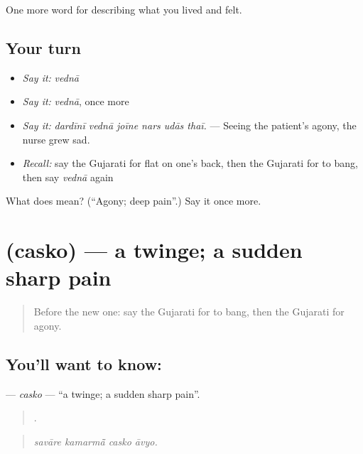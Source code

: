 \begin{grammarlens}[title={What you've built}]
One more word for describing what you lived and felt.
\end{grammarlens}

\subsection*{Your turn}
\begin{itemize}
\raggedright
  \item \emph{Say it:} \emph{vednā}
  \item \emph{Say it:} \emph{vednā}, once more
  \item \emph{Say it:} \emph{dardīnī vednā joīne nars udās thaī.} — Seeing the patient's agony, the nurse grew sad.
  \item \emph{Recall:} say the Gujarati for flat on one's back, then the Gujarati for to bang, then say \emph{vednā} again
\end{itemize}

\begin{tcolorbox}[breakable,colback=teal!4,colframe=teal!35!black,title={Before you move on}]
What does  mean? (\textquotedblleft{}Agony; deep pain\textquotedblright{}.) Say it once more.
\end{tcolorbox}
\section[\texorpdfstring{\gu{ચસકો} (casko)}{ચસકો (casko)}]{ (casko) — a twinge; a sudden sharp pain}

\label{lesson:GU-C483-casko}



\begin{quote}
Before the new one: say the Gujarati for to bang, then the Gujarati for agony.
\end{quote}

\subsection*{You'll want to know: }
\textbf{} — \emph{casko} — \textquotedblleft{}a twinge; a sudden sharp pain\textquotedblright{}.

\begin{quote}
   .
\end{quote}

\begin{quote}
\emph{savāre kamarmā̃ casko āvyo.}
\end{quote}

